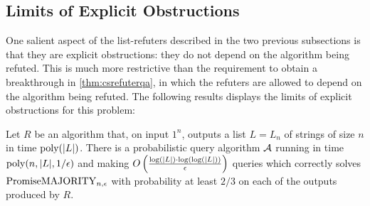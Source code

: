 \subsection{Limits of Explicit Obstructions}

One salient aspect of the list-refuters described 
in the two previous subsections is that they are explicit
obstructions: they do not depend on the algorithm being refuted. 
This is much more restrictive than the requirement to obtain
a breakthrough in \cref{thm:csrefuterqa}, in which the refuters are allowed to
depend on the algorithm being refuted. The following results displays
the limits of explicit obstructions for this problem:

\begin{theorem}
    \label{thm:explicitlimits}
Let $R$ be an algorithm that, on input $1^n$, outputs a list $L = L_n$ of strings of size $n$ in time $\text{poly}(|L|)$.
There is a probabilistic query algorithm $\mathcal{A}$ running in time $\text{poly}(n, |L|, 1/\epsilon)$ and making $O\left(\frac{\log (|L|) \cdot \log (\log (|L|))}{\epsilon}\right)$ queries
which correctly solves $\mathrm{PromiseMAJORITY}_{n, \epsilon}$ with probability at least $2/3$ on each of the outputs produced by $R$.
\end{theorem}
